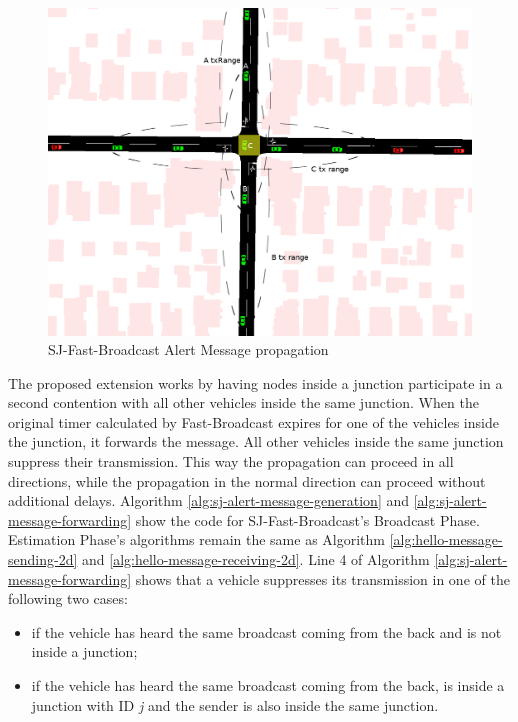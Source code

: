		\begin{figure}[H]
			\centering
			\includegraphics[width=\textwidth]{immagini/fb-junction-1}
			\caption{SJ-Fast-Broadcast Alert Message propagation}
			\label{fig:fb-junction-1}
		\end{figure}
		
		
		The proposed extension works by having nodes inside a junction participate in a second contention with all other vehicles inside the same junction. When the original timer calculated by Fast-Broadcast expires for one of the vehicles inside the junction, it forwards the message. All other vehicles inside the same junction suppress their transmission. This way the propagation can proceed in all directions, while the propagation in the normal direction can proceed without additional delays. Algorithm \ref{alg:sj-alert-message-generation} and \ref{alg:sj-alert-message-forwarding} show the code for SJ-Fast-Broadcast's Broadcast Phase. Estimation Phase's algorithms remain the same as Algorithm \ref{alg:hello-message-sending-2d} and \ref{alg:hello-message-receiving-2d}. Line 4 of Algorithm \ref{alg:sj-alert-message-forwarding} shows that a vehicle suppresses its transmission in one of the following two cases:
		\begin{itemize}
			\item if the vehicle has heard the same broadcast coming from the back and is not inside a junction;
			\item if the vehicle has heard the same broadcast coming from the back, is inside a junction with ID \textit{j} and the sender is also inside the same junction.
		\end{itemize}
		
